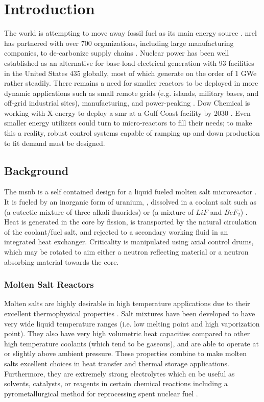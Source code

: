 \chapter{Introduction}
\label{Chapter:Introduction}

The world is attempting to move away fossil fuel as its main energy source \cite{ValluriPHD}. \acf{nrel} has partnered with over 700 organizations, including large manufacturing companies, to de-carbonize supply chains \cite{NREL-partner}. Nuclear power has been well established as an alternative for base-load electrical generation with 93 facilities in the United States 435 globally, most of which generate on the order of 1 GWe rather steadily. There remains a need for smaller reactors to be deployed in more dynamic applications such as small remote grids (e.g. islands, military bases, and off-grid industrial sites), manufacturing, and power-peaking \cite{DoD-remote}. Dow Chemical is working with X-energy to deploy a \acf{smr} at a Gulf Coast facility by 2030 \cite{DowXe}. Even smaller energy utilizers could turn to micro-reactors to fill their needs; to make this a reality, robust control systems capable of ramping up and down production to fit demand must be designed.

\section{Background}
The \acf{msnb} is a self contained design for a liquid fueled molten salt microreactor \cite{CarterPHD,PetersonMS}. It is fueled by an inorganic form of uranium, \UF, dissolved in a coolant salt such as \flinak (a eutectic mixture of three alkali fluorides) or \flibe  (a mixture of $LiF$ and $BeF_2$) \cite{RoperOverview}. Heat is generated in the core by fission, is transported by the natural circulation of the coolant/fuel salt, and rejected to a secondary working fluid in an integrated heat exchanger. Criticality is manipulated using axial control drums, which may be rotated to aim either a neutron reflecting material or a neutron absorbing material towards the core.

\subsection{Molten Salt Reactors}
Molten salts are highly desirable in high temperature applications due to their excellent thermophysical properties \cite{RoperReview}. Salt mixtures have been developed to have very wide liquid temperature ranges (i.e. low melting point and high vaporization point). They also have very high volumetric heat capacities compared to other high temperature coolants (which tend to be gaseous), and are able to operate at or slightly above ambient pressure. These properties combine to make molten salts excellent choices in heat transfer and thermal storage applications. Furthermore, they are extremely strong electrolytes which cn be useful as solvents, catalysts, or reagents in certain chemical reactions including a pyrometallurgical method for reprocessing spent nuclear fuel \cite{Simpson}.

